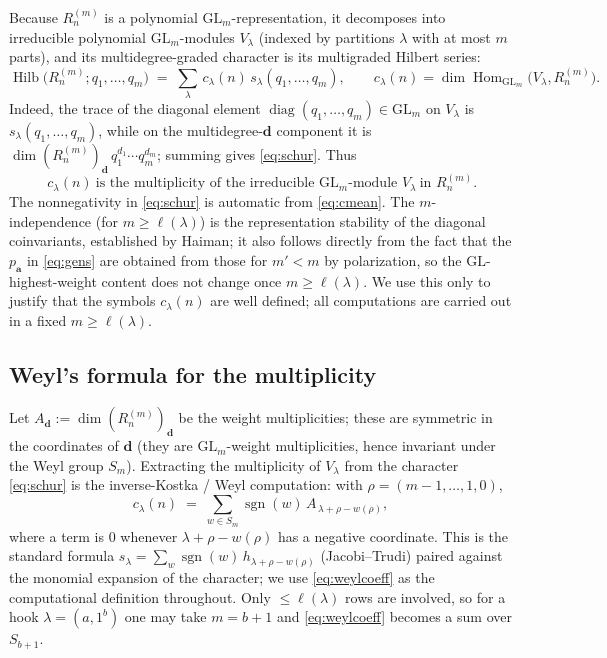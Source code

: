 \documentclass[11pt]{article}
\theoremstyle{definition}
\theoremstyle{remark}
\newcommand{\Hilb}{\operatorname{Hilb}}
\newcommand{\GL}{\mathrm{GL}}
\newcommand{\sgn}{\operatorname{sgn}}
\newcommand{\bs}{\boldsymbol}
\begin{document}
Because $R_n^{(m)}$ is a polynomial $\GL_m$-representation, it decomposes into irreducible
polynomial $\GL_m$-modules $V_\lambda$ (indexed by partitions $\lambda$ with at most $m$
parts), and its multidegree-graded character is its multigraded Hilbert series:
\begin{equation}\label{eq:schur}
\Hilb\bigl(R_n^{(m)};q_1,\dots,q_m\bigr)\;=\;\sum_{\lambda}\,c_\lambda(n)\,
s_\lambda(q_1,\dots,q_m),
\qquad
c_\lambda(n)=\dim\operatorname{Hom}_{\GL_m}\!\bigl(V_\lambda,R_n^{(m)}\bigr).
\end{equation}
Indeed, the trace of the diagonal element $\operatorname{diag}(q_1,\dots,q_m)\in\GL_m$ on
$V_\lambda$ is $s_\lambda(q_1,\dots,q_m)$, while on the multidegree-$\bs d$ component it is
$\dim(R_n^{(m)})_{\bs d}\,q_1^{d_1}\cdots q_m^{d_m}$; summing gives \eqref{eq:schur}.  Thus
\begin{equation}\label{eq:cmean}
\boxed{\,c_\lambda(n)\ \text{is the multiplicity of the irreducible }\GL_m\text{-module }
V_\lambda\ \text{in } R_n^{(m)}.}
\end{equation}
The nonnegativity in \eqref{eq:schur} is automatic from \eqref{eq:cmean}.  The
$m$-independence (for $m\ge\ell(\lambda)$) is the representation stability of the diagonal
coinvariants, established by Haiman; it also follows directly from the fact that the
$p_{\bs a}$ in \eqref{eq:gens} are obtained from those for $m'<m$ by polarization, so the
$\GL$-highest-weight content does not change once $m\ge\ell(\lambda)$.  We use this only to
justify that the symbols $c_\lambda(n)$ are well defined; all computations are carried out
in a fixed $m\ge\ell(\lambda)$.

\subsection{Weyl's formula for the multiplicity}\label{ss:weyl}
Let $A_{\bs d}:=\dim(R_n^{(m)})_{\bs d}$ be the weight multiplicities; these are symmetric
in the coordinates of $\bs d$ (they are $\GL_m$-weight multiplicities, hence invariant under
the Weyl group $S_m$).  Extracting the multiplicity of $V_\lambda$ from the character
\eqref{eq:schur} is the inverse-Kostka / Weyl computation: with $\rho=(m-1,\dots,1,0)$,
\begin{equation}\label{eq:weylcoeff}
c_\lambda(n)\;=\;\sum_{w\in S_m}\sgn(w)\,A_{\,\lambda+\rho-w(\rho)} ,
\end{equation}
where a term is $0$ whenever $\lambda+\rho-w(\rho)$ has a negative coordinate.  This is the
standard formula $s_\lambda=\sum_{w}\sgn(w)\,h_{\lambda+\rho-w(\rho)}$ (Jacobi--Trudi) paired
against the monomial expansion of the character; we use \eqref{eq:weylcoeff} as the
computational definition throughout.  Only $\le \ell(\lambda)$ rows are involved, so for a
hook $\lambda=(a,1^{b})$ one may take $m=b+1$ and \eqref{eq:weylcoeff} becomes a sum over
$S_{b+1}$.
\end{document}
